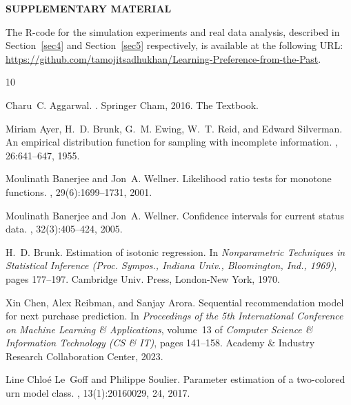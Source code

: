 \documentclass[12pt]{amsart}
\theoremstyle{plain}
\theoremstyle{remark}
\numberwithin{equation}{section}
\begin{document}
\label{supplementary-material}
\bigskip

\begin{center}
{\large\bf SUPPLEMENTARY MATERIAL}
\end{center}

The R-code for the simulation experiments and real data analysis, described in Section~\ref{sec4} and Section~\ref{sec5} respectively, is available at the following URL: \\ \href{https://github.com/tamojitsadhukhan/Learning-Preference-from-the-Past}{https://github.com/tamojitsadhukhan/Learning-Preference-from-the-Past}.

\begin{thebibliography}{10}

Charu~C. Aggarwal.
.
\newblock Springer Cham, 2016.
\newblock The Textbook.

Miriam Ayer, H.~D. Brunk, G.~M. Ewing, W.~T. Reid, and Edward Silverman.
\newblock An empirical distribution function for sampling with incomplete information.
, 26:641--647, 1955.

Moulinath Banerjee and Jon~A. Wellner.
\newblock Likelihood ratio tests for monotone functions.
, 29(6):1699--1731, 2001.

Moulinath Banerjee and Jon~A. Wellner.
\newblock Confidence intervals for current status data.
, 32(3):405--424, 2005.

H.~D. Brunk.
\newblock Estimation of isotonic regression.
\newblock In {\em Nonparametric {T}echniques in {S}tatistical {I}nference ({P}roc. {S}ympos., {I}ndiana {U}niv., {B}loomington, {I}nd., 1969)}, pages 177--197. Cambridge Univ. Press, London-New York, 1970.

Xin Chen, Alex Reibman, and Sanjay Arora.
\newblock Sequential recommendation model for next purchase prediction.
\newblock In {\em Proceedings of the 5th International Conference on Machine Learning \& Applications}, volume~13 of {\em Computer Science \& Information Technology (CS \& IT)}, pages 141--158. Academy \& Industry Research Collaboration Center, 2023.

Line Chlo\'e{} Le~Goff and Philippe Soulier.
\newblock Parameter estimation of a two-colored urn model class.
, 13(1):20160029, 24, 2017.


\end{thebibliography}
\end{document}
